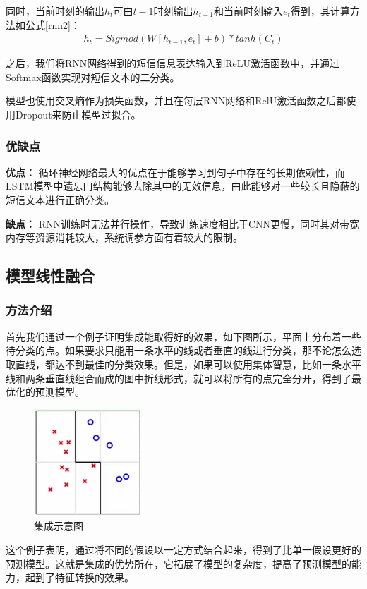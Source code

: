 \documentclass[a4paper]{article}
\begin{document}
同时，当前时刻的输出$h_t$可由$t-1$时刻输出$h_{t-1}$和当前时刻输入$e_t$得到，其计算方法如公式\eqref{rnn2}：
\begin{align}\label{rnn2}
    h_t = Sigmod(W[h_{t-1}, e_t]+b) * tanh(C_t)
\end{align}

之后，我们将RNN网络得到的短信信息表达输入到ReLU激活函数中，并通过Softmax函数实现对短信文本的二分类。

模型也使用交叉熵作为损失函数，并且在每层RNN网络和RelU激活函数之后都使用Dropout来防止模型过拟合。

\subsubsection{优缺点}
\textbf{优点：} 循环神经网络最大的优点在于能够学习到句子中存在的长期依赖性，而LSTM模型中遗忘门结构能够去除其中的无效信息，由此能够对一些较长且隐蔽的短信文本进行正确分类。

\textbf{缺点：} RNN训练时无法并行操作，导致训练速度相比于CNN更慢，同时其对带宽内存等资源消耗较大，系统调参方面有着较大的限制。



\subsection{模型线性融合}
\subsubsection{方法介绍}
首先我们通过一个例子证明集成能取得好的效果，如下图所示，平面上分布着一些待分类的点。如果要求只能用一条水平的线或者垂直的线进行分类，那不论怎么选取直线，都达不到最佳的分类效果。但是，如果可以使用集体智慧，比如一条水平线和两条垂直线组合而成的图中折线形式，就可以将所有的点完全分开，得到了最优化的预测模型。
\begin{figure}[H]
	\centering
	\includegraphics[scale=0.3,width=0.3\linewidth]{ensemble}
	\caption{集成示意图}
	\label{fig:ensemble}
\end{figure}
这个例子表明，通过将不同的假设以一定方式结合起来，得到了比单一假设更好的预测模型。这就是集成的优势所在，它拓展了模型的复杂度，提高了预测模型的能力，起到了特征转换的效果。
\end{document}

